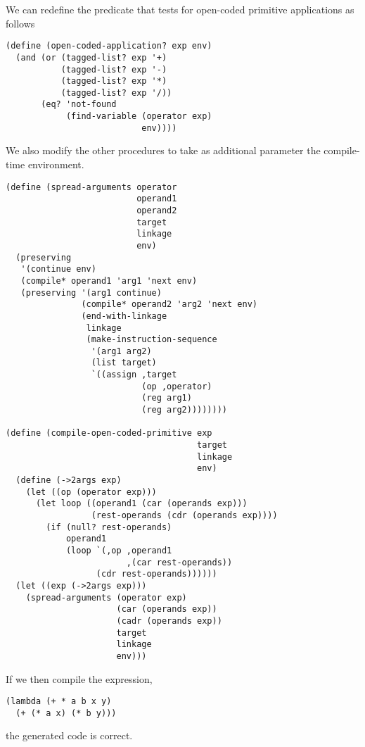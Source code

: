\documentclass[a4paper,12pt]{article}
\begin{document}
We can redefine the predicate that tests for open-coded primitive
applications as follows
\begin{lstlisting}
(define (open-coded-application? exp env)
  (and (or (tagged-list? exp '+)
           (tagged-list? exp '-)
           (tagged-list? exp '*)
           (tagged-list? exp '/))
       (eq? 'not-found
            (find-variable (operator exp)
                           env))))
\end{lstlisting}

We also modify the other procedures to take as additional parameter
the compile-time environment.

\begin{lstlisting}
(define (spread-arguments operator
                          operand1
                          operand2
                          target
                          linkage
                          env)
  (preserving
   '(continue env)
   (compile* operand1 'arg1 'next env)
   (preserving '(arg1 continue)
               (compile* operand2 'arg2 'next env)
               (end-with-linkage
                linkage
                (make-instruction-sequence
                 '(arg1 arg2)
                 (list target)
                 `((assign ,target
                           (op ,operator)
                           (reg arg1)
                           (reg arg2))))))))

(define (compile-open-coded-primitive exp
                                      target
                                      linkage
                                      env)
  (define (->2args exp)
    (let ((op (operator exp)))
      (let loop ((operand1 (car (operands exp)))
                 (rest-operands (cdr (operands exp))))
        (if (null? rest-operands)
            operand1
            (loop `(,op ,operand1
                        ,(car rest-operands))
                  (cdr rest-operands))))))
  (let ((exp (->2args exp)))
    (spread-arguments (operator exp)
                      (car (operands exp))
                      (cadr (operands exp))
                      target
                      linkage
                      env)))
\end{lstlisting}

If we then compile the expression,
\begin{lstlisting}
(lambda (+ * a b x y)
  (+ (* a x) (* b y)))
\end{lstlisting}

the generated code is correct.
\end{document}
